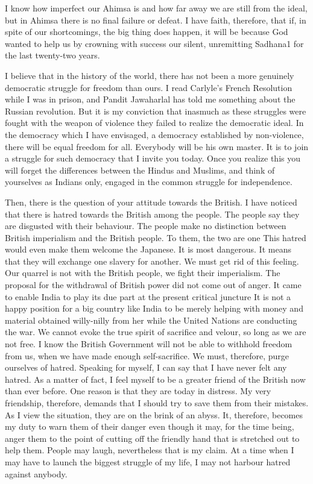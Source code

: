 \documentclass[a4paper]{amsbook}
\begin{document}
I know how imperfect our Ahimsa is and how far away we are still from the ideal, but in Ahimsa there is no final failure or defeat. I have faith, therefore, that if, in spite of our shortcomings, the big thing does happen, it will be because God wanted to help us by crowning with success our silent, unremitting Sadhana1 for the last twenty-two years.

I believe that in the history of the world, there has not been a more genuinely democratic struggle for freedom than ours. I read Carlyle's French Resolution while I was in prison, and Pandit Jawaharlal has told me something about the Russian revolution. But it is my conviction that inasmuch as these struggles were fought with the weapon of violence they failed to realize the democratic ideal. In the democracy which I have envisaged, a democracy established by non-violence, there will be equal freedom for all. Everybody will be his own master. It is to join a struggle for such democracy that I invite you today. Once you realize this you will forget the differences between the Hindus and Muslims, and think of yourselves as Indians only, engaged in the common struggle for independence.

Then, there is the question of your attitude towards the British. I have noticed that there is hatred towards the British among the people. The people say they are disgusted with their behaviour. The people make no distinction between British imperialism and the British people. To them, the two are one This hatred would even make them welcome the Japanese. It is most dangerous. It means that they will exchange one slavery for another. We must get rid of this feeling. Our quarrel is not with the British people, we fight their imperialism. The proposal for the withdrawal of British power did not come out of anger. It came to enable India to play its due part at the present critical juncture It is not a happy position for a big country like India to be merely helping with money and material obtained willy-nilly from her while the United Nations are conducting the war. We cannot evoke the true spirit of sacrifice and velour, so long as we are not free. I know the British Government will not be able to withhold freedom from us, when we have made enough self-sacrifice. We must, therefore, purge ourselves of hatred. Speaking for myself, I can say that I have never felt any hatred. As a matter of fact, I feel myself to be a greater friend of the British now than ever before. One reason is that they are today in distress. My very friendship, therefore, demands that I should try to save them from their mistakes. As I view the situation, they are on the brink of an abyss. It, therefore, becomes my duty to warn them of their danger even though it may, for the time being, anger them to the point of cutting off the friendly hand that is stretched out to help them. People may laugh, nevertheless that is my claim. At a time when I may have to launch the biggest struggle of my life, I may not harbour hatred against anybody.
\end{document}
